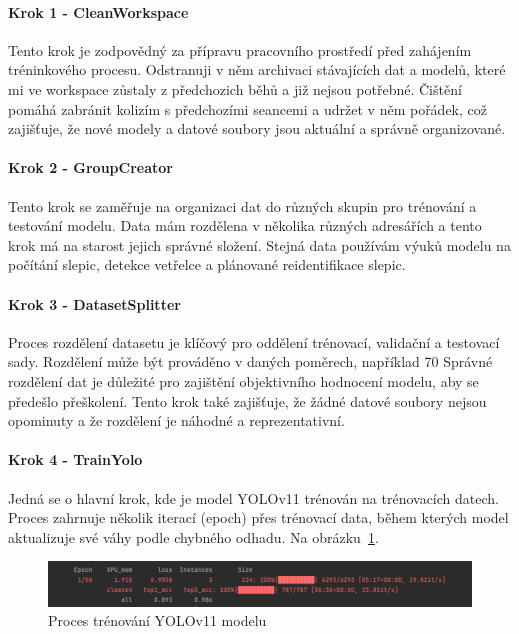 \paragraph*{Krok 1 - CleanWorkspace}

Tento krok je zodpovědný za přípravu pracovního prostředí před zahájením tréninkového procesu.
Odstranuji v něm archivaci stávajících dat a modelů, které mi ve workspace zůstaly z předchozich běhů a již nejsou potřebné.
Čištění pomáhá zabránit kolizím s předchozími seancemi a udržet v něm pořádek, což zajišťuje, že nové modely a datové soubory jsou aktuální a správně organizované.

\paragraph*{Krok 2 - GroupCreator}

Tento krok se zaměřuje na organizaci dat do různých skupin pro trénování a testování modelu.
Data mám rozdělena v několika různých adresářích a tento krok má na starost jejich správné složení.
Stejná data používám výuků modelu na počítání slepic, detekce vetřelce a plánované reidentifikace slepic.

\paragraph*{Krok 3 - DatasetSplitter}

Proces rozdělení datasetu je klíčový pro oddělení trénovací, validační a testovací sady.
Rozdělení může být prováděno v daných poměrech, například 70%
Správné rozdělení dat je důležité pro zajištění objektivního hodnocení modelu, aby se předešlo přeškolení.
Tento krok také zajišťuje, že žádné datové soubory nejsou opominuty a že rozdělení je náhodné a reprezentativní.

\paragraph*{Krok 4 - TrainYolo}

Jedná se o hlavní krok, kde je model YOLOv11 trénován na trénovacích datech.
Proces zahrnuje několik iterací (epoch) přes trénovací data, během kterých model aktualizuje své váhy podle chybného odhadu.
Na obrázku~\ref{fig:train_yolo}.


\begin{figure}[h]
    \centering
    \includegraphics[width=\textwidth]{img/train_yolo}
    \caption{Proces trénování YOLOv11 modelu}
    \label{fig:train_yolo}
\end{figure}

